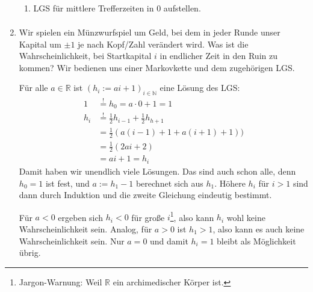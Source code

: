 \documentclass[a4paper,11pt,notitlepage,fullpage]{article}
\newcommand{\R}{\mathbb R}
\newcommand{\N}{\mathbb N}
\begin{document}
\begin{enumerate}
\begin{enumerate}
\item LGS für mittlere Trefferzeiten in $0$ aufstellen.
\begin{align*}
\end{align*}
\end{enumerate}

\item Wir spielen ein Münzwurfspiel um Geld, bei dem in jeder Runde unser Kapital um $\pm 1$ je nach Kopf/Zahl verändert wird. Was ist die Wahrscheinlichkeit, bei Startkapital $i$ in endlicher Zeit in den Ruin zu kommen? Wir bedienen uns einer Markovkette und dem zugehörigen LGS.

Für alle $a \in \R$ ist $(h_i := ai + 1)_{i \in \N}$ eine Lösung des LGS:
\begin{align*}
1 &\stackrel{!}{=} h_0 = a\cdot 0 + 1 = 1 \\
h_i &\stackrel{!}{=} \frac{1}{2}h_{i-1} + \frac{1}{2}h_{h+1} \\
&= \frac{1}{2}(a(i-1) + 1 + a(i+1) + 1)) \\
&= \frac{1}{2}(2ai + 2) \\
&= ai+1 = h_i
\end{align*}
Damit haben wir unendlich viele Lösungen. Das sind auch schon alle, denn $h_0 = 1$ ist fest, und $a := h_1 - 1$ berechnet sich aus $h_1$. Höhere $h_i$ für $i>1$ sind dann durch Induktion und die zweite Gleichung eindeutig bestimmt.

Für $a < 0$ ergeben sich $h_i < 0$ für große $i$\footnote{Jargon-Warnung: Weil $\R$ ein archimedischer Körper ist.}, also kann $h_i$ wohl keine Wahrscheinlichkeit sein. Analog, für $a > 0$ ist $h_1 > 1$, also kann es auch keine Wahrscheinlichkeit sein. Nur $a = 0$ und damit $h_i = 1$ bleibt als Möglichkeit übrig.

\end{enumerate}
\end{document}
